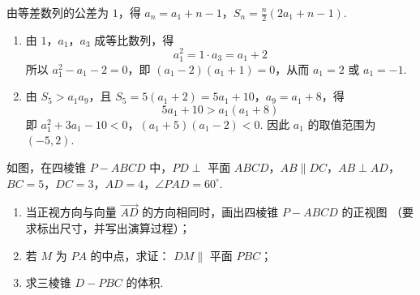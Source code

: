 \begin{solution}
由等差数列的公差为 \(1\)，得
\(a_n=a_1+n-1\)，\(S_n=\frac n2\left(2a_1+n-1\right)\).
\begin{enumerate}
\item 由 \(1\)，\(a_1\)，\(a_3\) 成等比数列，得
\[
a_1^2=1\cdot a_3=a_1+2
\]
所以 \(a_1^2-a_1-2=0\)，即 \((a_1-2)(a_1+1)=0\)，从而 \(a_1=2\) 或 \(a_1=-1\).

\item 由 \(S_5>a_1a_9\)，且 \(S_5=5(a_1+2)=5a_1+10\)，\(a_9=a_1+8\)，得
\[
5a_1+10>a_1(a_1+8)
\]
即
\(a_1^2+3a_1-10<0\)，\((a_1+5)(a_1-2)<0\).
因此 \(a_1\) 的取值范围为 \((-5,2)\).
\end{enumerate}
\end{solution}

\begin{problem}
如图，在四棱锥 \(P-ABCD\) 中，\(PD \perp\) 平面 \(ABCD\)，\(AB \parallel DC\)，\(AB \perp AD\)，\(BC = 5\)，\(DC = 3\)，\(AD = 4\)，\(\angle PAD = 60^\circ\).
\begin{enumerate}
\item 当正视方向与向量 \( \overrightarrow{AD} \) 的方向相同时，画出四棱锥 \(P-ABCD\) 的正视图 （要求标出尺寸，并写出演算过程）；
\item 若 \(M\) 为 \(PA\) 的中点，求证： \(DM \parallel\) 平面 \(PBC\)；
\item 求三棱锥 \(D-PBC\) 的体积.
\end{enumerate}
\end{problem}

